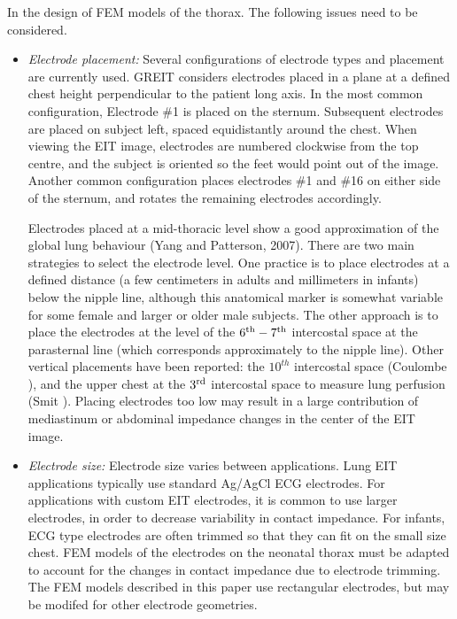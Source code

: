 \documentclass[12pt]{iopart}
\begin{document}
In the design of FEM models of the thorax. The
following issues need to be considered.
\begin{itemize}
\item
{\em Electrode placement:}
Several configurations of electrode types and placement
are currently used. GREIT considers electrodes placed
in a plane at a defined chest height perpendicular to 
the patient long axis. In the most common configuration,
Electrode \#1 is placed on the sternum. Subsequent
electrodes are placed on subject left, spaced equidistantly
around the chest. When viewing the EIT image, electrodes
are numbered clockwise from the top centre, and the subject
is oriented so the feet would point out of the image. Another
common configuration places electrodes \#1 and \#16 on
either side of the sternum, and rotates the remaining 
electrodes accordingly.

\hspace{0.5cm}
Electrodes placed at a mid-thoracic level show a 
good approximation of the global lung behaviour
(Yang and Patterson, 2007).
There are two main strategies to select the electrode
level.  One practice is to place
electrodes at a defined distance (a few centimeters 
in adults and millimeters in infants)
below the nipple line, although this anatomical
marker is somewhat variable for some female and
larger or older male subjects. 
The other approach is to 
place the electrodes at the level of the
$6^{\rm th} - 7^{\rm th}$ intercostal space at
the parasternal line (which corresponds approximately
to the nipple line). Other vertical placements have
been reported: the $10^{th}$ intercostal space 
(Coulombe ), and  
the upper chest at the $3^{\rm rd}$ intercostal space
to measure lung perfusion (Smit ).
Placing electrodes too low may result in a large
contribution of mediastinum or abdominal impedance
changes in the center of the EIT image.

\item
{\em Electrode size:}
Electrode size varies between applications. Lung
EIT applications typically
use standard Ag/AgCl ECG electrodes.
For applications with custom EIT electrodes, it is
common to use larger electrodes, in order to decrease
variability in contact impedance. For infants, 
ECG type electrodes are often trimmed so that they
can fit on the small size chest. FEM models of
the electrodes on the neonatal thorax must be adapted
to account for the changes in contact impedance
due to electrode trimming. The FEM models described
in this paper use rectangular electrodes, but may be
modifed for other electrode geometries.


\end{itemize}
\end{document}
